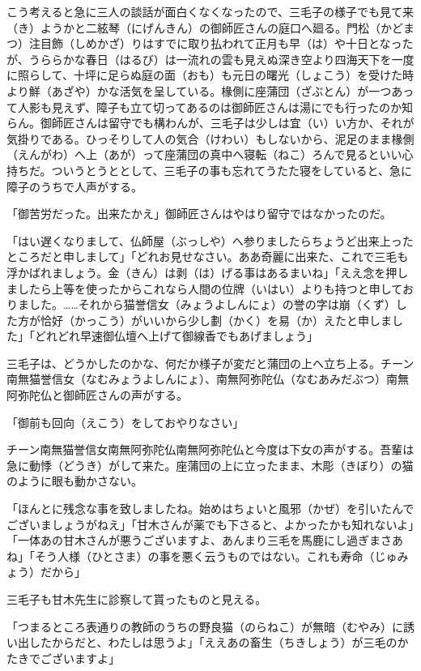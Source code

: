 \documentclass{book}
\begin{document}
こう考えると急に三人の談話が面白くなくなったので、三毛子の様子でも見て来（き）ようかと二絃琴（にげんきん）の御師匠さんの庭口へ廻る。門松（かどまつ）注目飾（しめかざ）りはすでに取り払われて正月も早（は）や十日となったが、うららかな春日（はるび）は一流れの雲も見えぬ深き空より四海天下を一度に照らして、十坪に足らぬ庭の面（おも）も元日の曙光（しょこう）を受けた時より鮮（あざや）かな活気を呈している。椽側に座蒲団（ざぶとん）が一つあって人影も見えず、障子も立て切ってあるのは御師匠さんは湯にでも行ったのか知らん。御師匠さんは留守でも構わんが、三毛子は少しは宜（い）い方か、それが気掛りである。ひっそりして人の気合（けわい）もしないから、泥足のまま椽側（えんがわ）へ上（あが）って座蒲団の真中へ寝転（ねこ）ろんで見るといい心持ちだ。ついうとうととして、三毛子の事も忘れてうたた寝をしていると、急に障子のうちで人声がする。

「御苦労だった。出来たかえ」御師匠さんはやはり留守ではなかったのだ。

「はい遅くなりまして、仏師屋（ぶっしや）へ参りましたらちょうど出来上ったところだと申しまして」「どれお見せなさい。ああ奇麗に出来た、これで三毛も浮かばれましょう。金（きん）は剥（は）げる事はあるまいね」「ええ念を押しましたら上等を使ったからこれなら人間の位牌（いはい）よりも持つと申しておりました。\ldots{}\ldots{}それから猫誉信女（みょうよしんにょ）の誉の字は崩（くず）した方が恰好（かっこう）がいいから少し劃（かく）を易（か）えたと申しました」「どれどれ早速御仏壇へ上げて御線香でもあげましょう」

三毛子は、どうかしたのかな、何だか様子が変だと蒲団の上へ立ち上る。チーン南無猫誉信女（なむみょうよしんにょ）、南無阿弥陀仏（なむあみだぶつ）南無阿弥陀仏と御師匠さんの声がする。

「御前も回向（えこう）をしておやりなさい」

チーン南無猫誉信女南無阿弥陀仏南無阿弥陀仏と今度は下女の声がする。吾輩は急に動悸（どうき）がして来た。座蒲団の上に立ったまま、木彫（きぼり）の猫のように眼も動かさない。

「ほんとに残念な事を致しましたね。始めはちょいと風邪（かぜ）を引いたんでございましょうがねえ」「甘木さんが薬でも下さると、よかったかも知れないよ」「一体あの甘木さんが悪うございますよ、あんまり三毛を馬鹿にし過ぎまさあね」「そう人様（ひとさま）の事を悪く云うものではない。これも寿命（じゅみょう）だから」

三毛子も甘木先生に診察して貰ったものと見える。

「つまるところ表通りの教師のうちの野良猫（のらねこ）が無暗（むやみ）に誘い出したからだと、わたしは思うよ」「ええあの畜生（ちきしょう）が三毛のかたきでございますよ」
\end{document}
